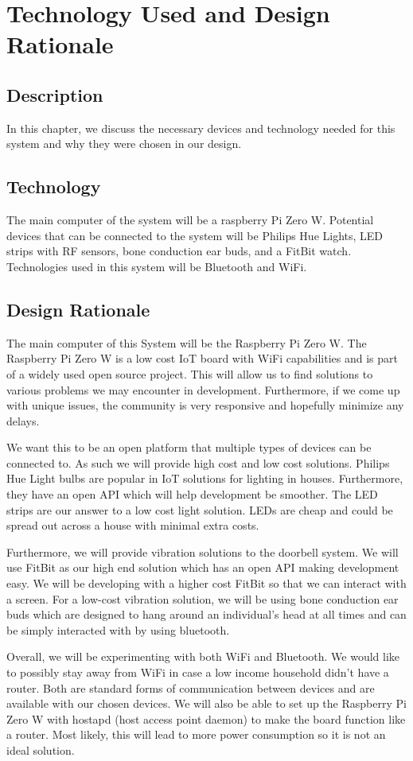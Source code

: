 \chapter{Technology Used and Design Rationale}

\section{Description}
In this chapter, we discuss the necessary devices and technology needed for this system and why they were chosen in our design.

\section{Technology}
The main computer of the system will be a raspberry Pi Zero W. Potential devices that can be connected to the system will be Philips Hue Lights, LED strips with RF sensors, bone conduction ear buds, and a FitBit watch. Technologies used in this system will be Bluetooth and WiFi.

\section{Design Rationale}
The main computer of this System will be the Raspberry Pi Zero W. The Raspberry Pi Zero W is a low cost IoT board with WiFi capabilities and is part of a widely used open source project. This will allow us to find solutions to various problems we may encounter in development. Furthermore, if we come up with unique issues, the community is very responsive and hopefully minimize any delays.

	We want this to be an open platform that multiple types of devices can be connected to. As such we will provide high cost and low cost solutions. Philips Hue Light bulbs are popular in IoT solutions for lighting in houses. Furthermore, they have an open API which will help development be smoother. The LED strips are our answer to a low cost light solution. LEDs are cheap and could be spread out across a house with minimal extra costs.
	
	Furthermore, we will provide vibration solutions to the doorbell system. We will use FitBit as our high end solution which has an open API making development easy. We will be developing with a higher cost FitBit so that we can interact with a screen. For a low-cost vibration solution, we will be using bone conduction ear buds which are designed to hang around an individual’s head at all times and can be simply interacted with by using bluetooth.
	
	Overall, we will be experimenting with both WiFi and Bluetooth. We would like to possibly stay away from WiFi in case a low income household didn’t have a router. Both are standard forms of communication between devices and are available with our chosen devices. We will also be able to set up the Raspberry Pi Zero W with hostapd (host access point daemon) to make the board function like a router. Most likely, this will lead to more power consumption so it is not an ideal solution.
